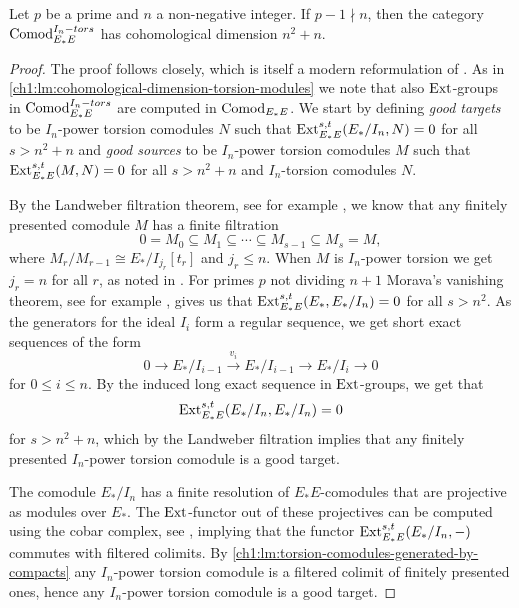 \begin{lemma}
    \label{ch1:lm:cohomological-dimension-torsion-comodules}
    Let $p$ be a prime and $n$ a non-negative integer. If $p-1\nmid n$, then the category $\mathrm{Comod}_{E_*E}^{I_n-tors}$ has cohomological dimension $n^2+n$. 
\end{lemma}
\begin{proof}
    The proof follows \cite[2.5]{pstragowski_2021} closely, which is itself a modern reformulation of \cite[3.4.3.9]{franke_96}. As in \cref{ch1:lm:cohomological-dimension-torsion-modules} we note that also $\operatorname{Ext}$-groups in $\mathrm{Comod}_{E_*E}^{I_n-tors}$ are computed in $\mathrm{Comod}_{E_*E}$. We start by defining \emph{good targets} to be $I_n$-power torsion comodules $N$ such that $\operatorname{Ext}_{E_*E}^{s,t}(E_*/I_n, N)=0$ for all $s>n^2+n$ and \emph{good sources} to be $I_n$-power torsion comodules $M$ such that $\operatorname{Ext}_{E_*E}^{s,t}(M,N)=0$ for all $s>n^2+n$ and $I_n$-torsion comodules $N$. 

    By the Landweber filtration theorem, see for example \cite[5.7]{hovey-strickland_2005a}, we know that any finitely presented comodule $M$ has a finite filtration 
    $$0=M_0 \subseteq M_1 \subseteq \cdots \subseteq M_{s-1}\subseteq M_s=M,$$
    where $M_r/M_{r-1} \cong E_*/I_{j_r}[t_r]$ and $j_r\leq n$. When $M$ is $I_n$-power torsion we get $j_r=n$ for all $r$, as noted in \cite[4.3]{hovey-strickland_2005a}. For primes $p$ not dividing $n+1$ Morava's vanishing theorem, see for example \cite[6.2.10]{ravenel_86}, gives us that $\operatorname{Ext}_{E_*E}^{s,t}(E_*, E_*/I_n) = 0$ for all $s>n^2$. As the generators for the ideal $I_i$ form a regular sequence, we get short exact sequences of the form 
    \[0\longrightarrow E_*/I_{i-1} \overset{v_i}\longrightarrow E_*/I_{i-1} \longrightarrow E_*/I_i\longrightarrow 0\]
    for $0\leq i\leq n$. By the induced long exact sequence in $\operatorname{Ext}$-groups, we get that 
    \[\operatorname{Ext}_{E_*E}^{s,t}(E_*/I_n, E_*/I_n) = 0\] 
    for $s>n^2+n$, which by the Landweber filtration implies that any finitely presented $I_n$-power torsion comodule is a good target.
    
    The comodule $E_*/I_n$ has a finite resolution of $E_*E$-comodules that are projective as modules over $E_*$. The $\operatorname{Ext}$-functor out of these projectives can be computed using the cobar complex, see \cite[A1.2.12]{ravenel_86}, implying that the functor $\operatorname{Ext}_{E_*E}^{s,t}(E_*/I_n, -)$ commutes with filtered colimits. By \cref{ch1:lm:torsion-comodules-generated-by-compacts} any $I_n$-power torsion comodule is a filtered colimit of finitely presented ones, hence any $I_n$-power torsion comodule is a good target. 


\end{proof}
